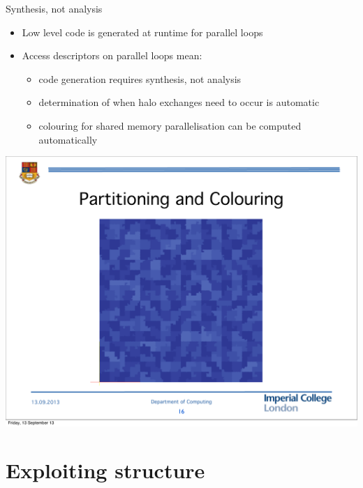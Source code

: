 \documentclass[bigger]{beamer}
\begin{document}
\begin{frame}[label={sec:orgheadline9}]{Synthesis, not analysis}
\begin{itemize}
\item Low level code is generated at runtime for parallel loops
\item Access descriptors on parallel loops mean:
\begin{itemize}
\item code generation requires synthesis, not analysis
\item determination of when halo exchanges need to occur is automatic
\item colouring for shared memory parallelisation can be computed
automatically
\end{itemize}
\end{itemize}

\pause
\begin{center}
\includegraphics[height=0.6\textheight]{02-22-SIAM-PP-extruded-meshes.figures/mesh-colouring}
\end{center}
\end{frame}

\section{Exploiting structure}
\label{sec:orgheadline14}
\end{document}
